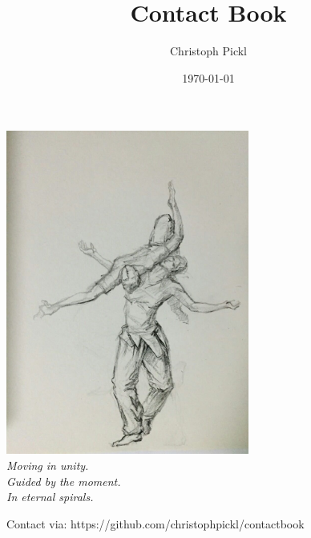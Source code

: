 \documentclass[a4paper]{article}
\title{Contact Book}
\date{\today}
\author{Christoph Pickl}
\begin{document}
\maketitle
\begin{center}
	\includegraphics[width=8cm]{images/cover}
	\vspace{0.5cm}
	\\
	\textit{Moving in unity.}\\
	\textit{Guided by the moment.}\\
	\textit{In eternal spirals.}
\end{center}
\newpage
\tableofcontents
Contact via: https://github.com/christophpickl/contactbook
\newpage
{}
















\listoffigures
\printglossaries
\end{document}
